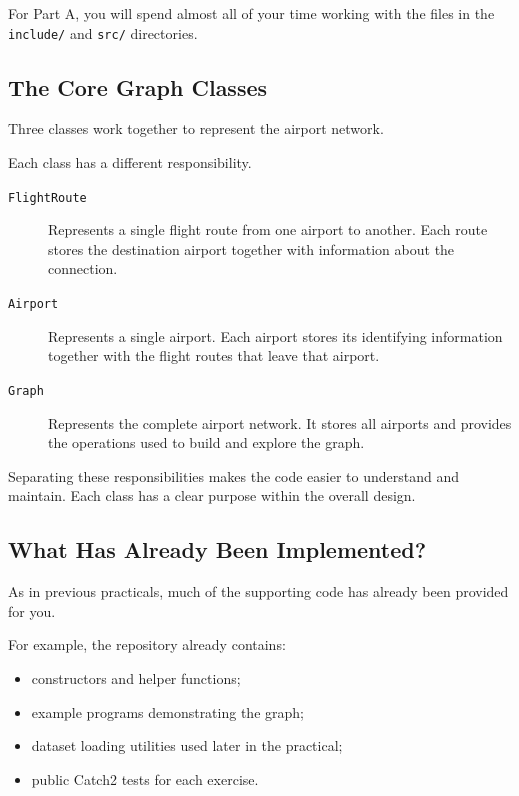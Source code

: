 \documentclass{csc2059practical}
\begin{document}
For Part A, you will spend almost all of your time working with the files in the
\texttt{include/} and \texttt{src/} directories.


\subsection*{The Core Graph Classes}

Three classes work together to represent the airport network.

Each class has a different responsibility.

\begin{description}
\item[\texttt{FlightRoute}] Represents a single flight route from one
airport to another. Each route stores the destination airport together with
information about the connection.

\item[\texttt{Airport}] Represents a single airport. Each airport stores its
identifying information together with the flight routes that leave that
airport.
\item[\texttt{Graph}] Represents the complete airport network. It stores all
airports and provides the operations used to build and explore the graph.

\end{description}

Separating these responsibilities makes the code easier to understand and
maintain. Each class has a clear purpose within the overall design.


\subsection*{What Has Already Been Implemented?}

As in previous practicals, much of the supporting code has already been provided
for you.

For example, the repository already contains:

\begin{itemize}
\item constructors and helper functions;
\item example programs demonstrating the graph;
\item dataset loading utilities used later in the practical;
\item public Catch2 tests for each exercise.
\end{itemize}
\end{document}
